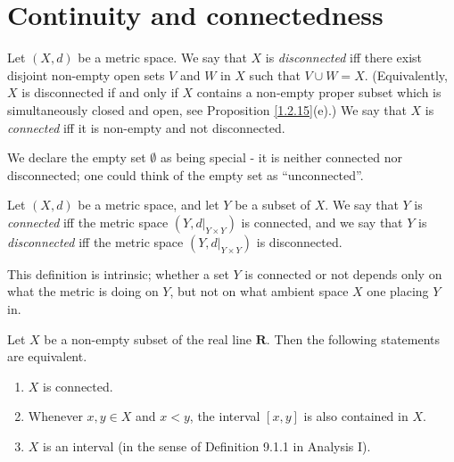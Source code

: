 \section{Continuity and connectedness}\label{sec 2.4}

\begin{definition}\label{2.4.1}
    Let \((X, d)\) be a metric space.
    We say that \(X\) is \emph{disconnected} iff there exist disjoint non-empty open sets \(V\) and \(W\) in \(X\) such that \(V \cup W = X\).
    (Equivalently, \(X\) is disconnected if and only if \(X\) contains a non-empty proper subset which is simultaneously closed and open, see Proposition \ref{1.2.15}(e).)
    We say that \(X\) is \emph{connected} iff it is non-empty and not disconnected.
\end{definition}

\begin{note}
    We declare the empty set \(\emptyset\) as being special
    - it is neither connected nor disconnected;
    one could think of the empty set as ``unconnected''.
\end{note}

\setcounter{theorem}{2}
\begin{definition}\label{2.4.3}
    Let \((X, d)\) be a metric space, and let \(Y\) be a subset of \(X\).
    We say that \(Y\) is \emph{connected} iff the metric space \((Y, d|_{Y \times Y})\) is connected, and we say that \(Y\) is \emph{disconnected} iff the metric space \((Y, d|_{Y \times Y})\) is disconnected.
\end{definition}

\begin{remark}\label{2.4.4}
    This definition is intrinsic;
    whether a set \(Y\) is connected or not depends only on what the metric is doing on \(Y\), but not on what ambient space \(X\) one placing \(Y\) in.
\end{remark}

\begin{theorem}\label{2.4.5}
    Let \(X\) be a non-empty subset of the real line \(\mathbf{R}\).
    Then the following statements are equivalent.
    \begin{enumerate}
        \item \(X\) is connected.
        \item Whenever \(x, y \in X\) and \(x < y\), the interval \([x, y]\) is also contained in \(X\).
        \item \(X\) is an interval (in the sense of Definition 9.1.1 in Analysis I).
    \end{enumerate}
\end{theorem}

